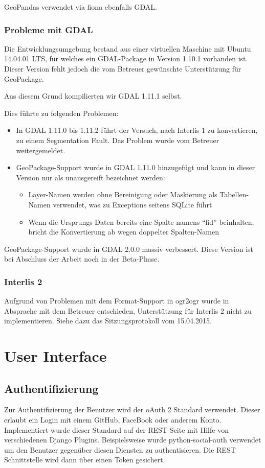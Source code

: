 GeoPandas verwendet via fiona ebenfalls GDAL.

\subsubsection{Probleme mit GDAL}
Die Entwicklungsumgebung bestand aus einer virtuellen Maschine mit Ubuntu 14.04.01 LTS, für welches ein GDAL-Package in Version 1.10.1 vorhanden ist. Dieser Version fehlt jedoch die vom Betreuer gewünschte Unterstützung für GeoPackage.

Aus diesem Grund kompilierten wir GDAL 1.11.1 selbst.

Dies führte zu folgenden Problemen:
\begin{itemize}
\item In GDAL 1.11.0 bis 1.11.2 führt der Versuch, nach Interlis 1 zu konvertieren, zu einem Segmentation Fault. Das Problem wurde vom Betreuer weitergemeldet.
\item GeoPackage-Support wurde in GDAL 1.11.0 hinzugefügt und kann in dieser Version nur als unausgereift bezeichnet werden:
  \begin{itemize}
  \item Layer-Namen werden ohne Bereinigung oder Maskierung als Tabellen-Namen verwendet, was zu Exceptions seitens SQLite führt
  \item Wenn die Ursprungs-Daten bereits eine Spalte namens ``fid'' beinhalten, bricht die Konvertierung ab wegen doppelter Spalten-Namen
  \end{itemize}
\end{itemize}

GeoPackage-Support wurde in GDAL 2.0.0 massiv verbessert. Diese Version ist bei Abschluss der Arbeit noch in der Beta-Phase.

\subsubsection{Interlis 2}
Aufgrund von Problemen mit dem Format-Support in ogr2ogr wurde in Absprache mit dem Betreuer entschieden, Unterstützung für Interlis 2 nicht zu implementieren. Siehe dazu das Sitzungsprotokoll vom 15.04.2015.

\section{User Interface}
\subsection{Authentifizierung}
Zur Authentifizierung der Benutzer wird der oAuth 2 Standard verwendet. Dieser erlaubt ein Login mit einem GitHub, FaceBook oder anderem Konto. Implementiert wurde dieser Standard auf der REST Seite mit Hilfe von verschiedenen Django Plugins. 
Beispielsweise wurde python-social-auth verwendet um den Benutzer gegenüber diesen Diensten zu authentisieren. Die REST Schnittstelle wird dann über einen Token gesichert.


